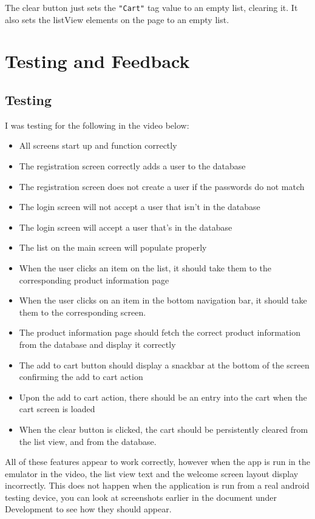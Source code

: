\documentclass{scrreprt}
\begin{document}
The clear button just sets the \texttt{"Cart"} tag value to an empty list, clearing it. It also sets the listView elements on the page to an empty list.

\chapter{Testing and Feedback}\label{testing}

\section{Testing}

I was testing for the following in the video below:

\begin{itemize}
    \item All screens start up and function correctly
    \item The registration screen correctly adds a user to the database
    \item The registration screen does not create a user if the passwords do not match
    \item The login screen will not accept a user that isn't in the database
    \item The login screen will accept a user that's in the database
    \item The list on the main screen will populate properly
    \item When the user clicks an item on the list, it should take them to the corresponding product information page
    \item When the user clicks on an item in the bottom navigation bar, it should take them to the corresponding screen.
    \item The product information page should fetch the correct product information from the database and display it correctly
    \item The add to cart button should display a snackbar at the bottom of the screen confirming the add to cart action
    \item Upon the add to cart action, there should be an entry into the cart when the cart screen is loaded
    \item When the clear button is clicked, the cart should be persistently cleared from the list view, and from the database.
\end{itemize}

All of these features appear to work correctly, however when the app is run in the emulator in the video, the list view text and the welcome screen layout display incorrectly. This does not happen when the application is run from a real android testing device, you can look at screenshots earlier in the document under Development to see how they should appear.
\end{document}

